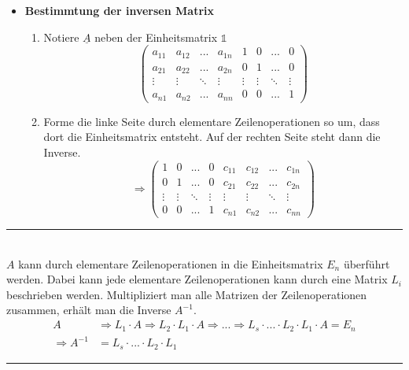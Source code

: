 \documentclass{article}
\begin{document}
	\begin{itemize}
		\item \textbf{Bestimmtung der inversen Matrix}
			\begin{enumerate}
				\item Notiere $\underline{A}$ neben der Einheitsmatrix $\mathbb{1}$\\
					\begin{equation}
						\left(\begin{array}{cccc|cccc}
							a_{11} & a_{12} & ... & a_{1n} & 1 & 0 &... & 0\\
							a_{21} & a_{22} & ... & a_{2n} & 0 & 1 &... & 0\\
							\vdots & \vdots & \ddots & \vdots & \vdots & \vdots & \ddots & \vdots\\
							a_{n1} & a_{n2} & ... & a_{nn} & 0 & 0 & ... & 1
						\end{array}\right)
					\end{equation}


				\item Forme die linke Seite durch elementare Zeilenoperationen so um, dass dort die Einheitsmatrix entsteht. Auf der rechten Seite steht dann die Inverse.
					\begin{equation}
						\Rightarrow
	\left(\begin{array}{cccc|cccc}
		1 & 0 &... & 0 & c_{11} & c_{12} & ... & c_{1n} \\
		0 & 1 &... & 0 & c_{21} & c_{22} & ... & c_{2n} \\
		\vdots & \vdots & \ddots & \vdots & \vdots & \vdots & \ddots & \vdots\\
		0 & 0 & ... & 1 & c_{n1} & c_{n2} & ... & c_{nn}
	\end{array}\right)
					\end{equation}

			\end{enumerate}
	\end{itemize}


\newpage


{\color{violet}
\hrule
	\\
	$A$ kann durch elementare Zeilenoperationen in die Einheitsmatrix $E_n$ überführt werden. Dabei kann jede elementare Zeilenoperationen kann durch eine Matrix $L_i$ beschrieben werden. Multipliziert man alle Matrizen der Zeilenoperationen zusammen, erhält man die Inverse $A^{-1}$.
	\begin{align*}
		A &\Rightarrow L_1\cdot A \Rightarrow L_2\cdot L_1\cdot A \Rightarrow ...\Rightarrow L_s\cdot ...\cdot L_2\cdot L_1\cdot A = E_n\\
		\Rightarrow A^{-1} &= L_s\cdot ...\cdot L_2\cdot L_1
	\end{align*}
\hrule
}
\end{document}
